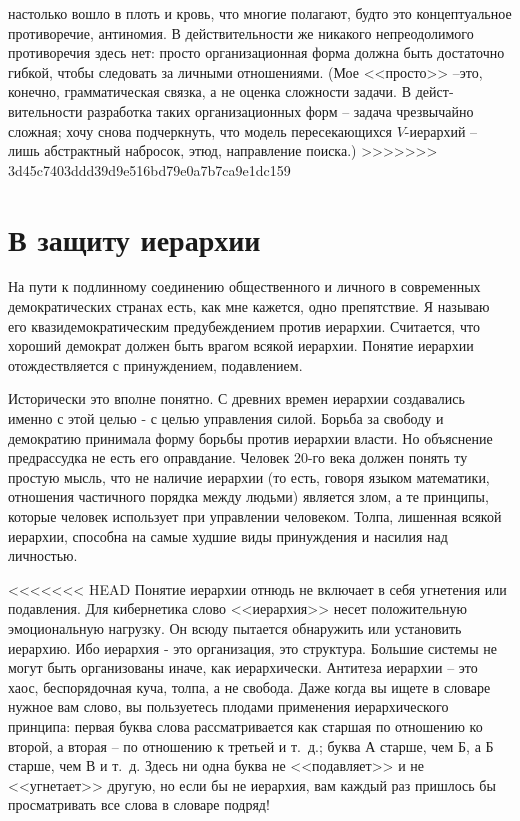 \documentclass{book}
\begin{document}
 настолько вошло в плоть и кровь, что многие полагают, будто это концеп­туальное противоречие, антиномия. В действительности же ника­кого непреодолимого противоречия здесь нет: просто организа­ционная форма должна быть достаточно гибкой, чтобы следо­вать за личными отношениями. (Мое <<просто>> --это, конечно, грамматическая связка, а не оценка сложности задачи. В дейст­вительности разработка таких организационных форм -- задача чрезвычайно сложная; хочу снова подчеркнуть, что модель пересекающихся $V$-иерархий -- лишь абстрактный набросок, этюд, направление поиска.)
>>>>>>> 3d45c7403ddd39d9e516bd79e0a7b7ca9e1dc159



\section{В защиту иерархии}

На пути к подлинному соединению общественного и личного в современных демократических странах есть, как мне кажется, одно препятствие. Я называю его квазидемократическим преду­беждением против иерархии. Считается, что хороший демократ должен быть врагом всякой иерархии. Понятие иерархии отож­дествляется с принуждением, подавлением.

Исторически это вполне понятно. С древних времен иерар­хии создавались именно с этой целью - с целью управления си­лой. Борьба за свободу и демократию принимала форму борьбы против иерархии власти. Но объяснение предрассудка не есть его оправдание. Человек 20-го века должен понять ту простую мысль, что не наличие иерархии (то есть, говоря языком математики, отношения частичного порядка между людьми) является злом, а те принципы, которые человек использует при управлении че­ловеком. Толпа, лишенная всякой иерархии, способна на самые худшие виды принуждения и насилия над личностью.

<<<<<<< HEAD
Понятие иерархии отнюдь не включает в себя угнетения или по­давления. Для кибернетика слово <<иерархия>> несет положитель­ную эмоциональную нагрузку. Он всюду пытается обнаружить или установить иерархию. Ибо иерархия ‑ это организация, это структура. Большие системы не могут быть организованы иначе, как иерархически. Антитеза иерархии -- это хаос, беспорядочная куча, толпа, а не свобода. Даже когда вы ищете в словаре нужное вам слово, вы пользуетесь плодами применения иерархического принципа: первая буква слова рассматривается как старшая по отношению ко второй, а вторая -- по отношению к третьей и т.~д.; буква А старше, чем Б, а Б старше, чем В и т.~д. Здесь ни одна буква не <<подавляет>> и не <<угнетает>> другую, но если бы не ие­рархия, вам каждый раз пришлось бы просматривать все слова в словаре подряд!
\end{document}
